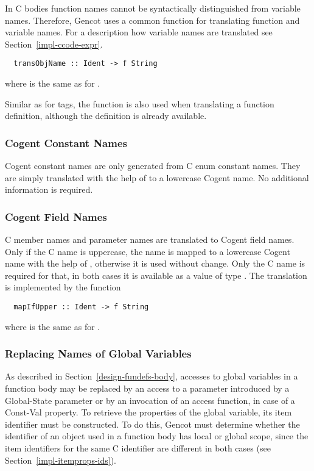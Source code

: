In C bodies function names cannot be syntactically distinguished from variable names. Therefore, Gencot
uses a common function for translating function and variable names. For a description how variable
names are translated see Section~\ref{impl-ccode-expr}.
\begin{verbatim}
  transObjName :: Ident -> f String
\end{verbatim}
where  is the same as for .

Similar as for tags, the function is also used when translating a function definition, although the 
definition is already available.

\subsubsection{Cogent Constant Names}

Cogent constant names are only generated from C enum constant names. They are simply translated
with the help of  to a lowercase Cogent name. No additional information is required.

\subsubsection{Cogent Field Names}

C member names and parameter names are translated to Cogent field names. Only if the C name is
uppercase, the name is mapped to a lowercase Cogent name with the help of , 
otherwise it is used without change. Only the C name is required for that, in both cases it is
available as a value of type . The translation is implemented by the function
\begin{verbatim}
  mapIfUpper :: Ident -> f String
\end{verbatim}
where  is the same as for .

\subsubsection{Replacing Names of Global Variables}

As described in Section~\ref{design-fundefs-body}, accesses to global variables in a function body may 
be replaced by an access to a parameter introduced by a Global-State parameter or by an invocation of an 
access function, in case of a Const-Val property. To retrieve the properties of the global variable, its item
identifier must be constructed. To do this, Gencot must determine whether the identifier of an object 
used in a function body has local or global scope, since the item identifiers for the same C identifier
are different in both cases (see Section~\ref{impl-itemprops-ids}).

